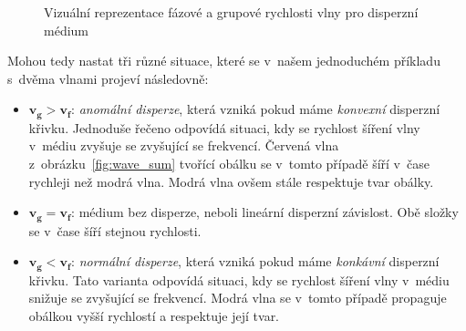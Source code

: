 \begin{figure}[htbp]
\centering
{}
\caption{Vizuální reprezentace fázové a grupové
rychlosti vlny pro disperzní médium}
\label{fig:group_velocity}
\end{figure}

Mohou tedy nastat tři různé situace, které
se v~našem jednoduchém příkladu s~dvěma vlnami
projeví následovně:
\begin{itemize}
    \item $\bm{v_g > v_f}$:
    \textit{anomální disperze}, která
    vzniká pokud máme \textit{konvexní}
    disperzní křivku. Jednoduše řečeno
    odpovídá situaci, kdy se rychlost
    šíření vlny v~médiu zvyšuje se
    zvyšující se frekvencí. Červená
    vlna z~obrázku~\ref{fig:wave_sum}
    tvořící obálku se v~tomto případě
    šíří v~čase rychleji než modrá
    vlna. Modrá vlna ovšem stále
    respektuje tvar obálky.
    
    \item $\bm{v_g = v_f}$:
    médium bez disperze, neboli lineární
    disperzní závislost. Obě složky se
v~čase šíří stejnou rychlosti.
    
    \item $\bm{v_g < v_f}$:
    \textit{normální disperze}, která
    vzniká pokud máme \textit{konkávní}
    disperzní křivku. Tato varianta odpovídá
    situaci, kdy se rychlost šíření vlny
    v~médiu snižuje se zvyšující se frekvencí.
    Modrá vlna se v~tomto případě propaguje
    obálkou vyšší rychlostí a respektuje její
    tvar.
\end{itemize}


